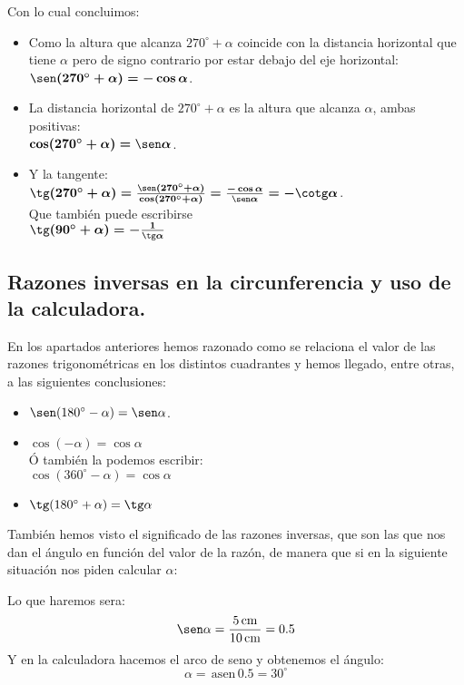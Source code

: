 \documentclass[a4paper,11pt,answers]{exam}
\newcommand{\degree}{^\circ}
\newcommand{\asen}{\,\mathrm{asen}\,}
\newcommand\unidad[1]{\,\text{#1}}
\begin{document}
{\begin{wrapfigure}{r}{.45\textwidth}
\end{wrapfigure}
Con lo cual concluimos:
\begin{itemize}
\item Como la altura que alcanza $270\degree + \alpha$ coincide con la distancia horizontal
  que tiene $\alpha$ pero de signo contrario por estar debajo del eje horizontal:\\
  $\boldsymbol{\sen (270\degree + \alpha) = -\cos \alpha}$.
\item La distancia horizontal de $270\degree + \alpha$ es la altura que alcanza $\alpha$,
  ambas positivas:\\
  $\boldsymbol{\cos (270\degree + \alpha) = \sen \alpha}$.
\item Y la tangente:\\
  $\boldsymbol{\tg (270\degree +  \alpha) =
    \frac{\sen (270\degree + \alpha)}{\cos (270\degree+ \alpha)} =
  \frac{-\cos \alpha}{\sen \alpha} = -\cotg \alpha}$.\\
  Que también puede escribirse\\
  $\boldsymbol{\tg (90\degree +  \alpha) = -\frac{1}{\tg \alpha}}$
  
\end{itemize}
}

\subsection{Razones inversas en la circunferencia y uso de la calculadora.}
En los apartados anteriores hemos razonado como se relaciona el valor de las razones
trigonométricas en los distintos cuadrantes y hemos llegado, entre otras, a las siguientes conclusiones:
\begin{itemize}
\item $\sen (180\degree - \alpha) = \sen \alpha$.
\item $\cos (-\alpha) = \cos \alpha$\\
  Ó también la podemos escribir:\\
  $\cos (360\degree - \alpha) = \cos \alpha$
\item $\tg (180\degree + \alpha) = \tg \alpha$
\end{itemize}

También hemos visto el significado de las razones inversas, que son las que nos dan el ángulo en
función del valor de la razón, de manera que si en la siguiente situación nos piden calcular
$\alpha$:
\begin{center}
\end{center}
Lo que haremos sera:
\[\sen \alpha = \frac{5\unidad{cm}}{10\unidad{cm}} = 0.5\]
Y en la calculadora hacemos el arco de seno y obtenemos el ángulo:
\[\alpha = \asen 0.5 = 30\degree\]
\end{document}
